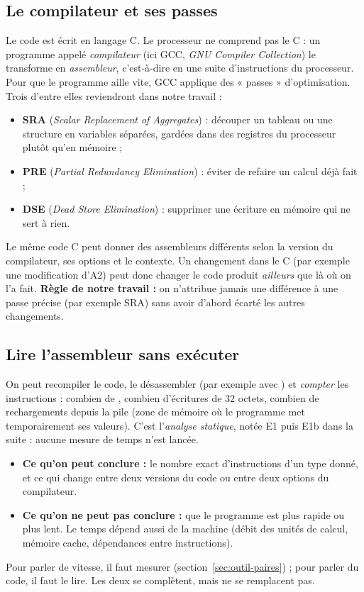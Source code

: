 \subsection{Le compilateur et ses passes}\label{sec:outil-compilo}
Le code est écrit en langage C. Le processeur ne comprend pas le C : un programme appelé \emph{compilateur} (ici GCC, \emph{GNU Compiler Collection}) le transforme en \emph{assembleur}, c'est-à-dire en une suite d'instructions du processeur. Pour que le programme aille vite, GCC applique des « passes » d'optimisation. Trois d'entre elles reviendront dans notre travail :
\begin{itemize}[itemsep=1pt]
\item \textbf{SRA} (\emph{Scalar Replacement of Aggregates}) : découper un tableau ou une structure en variables séparées, gardées dans des registres du processeur plutôt qu'en mémoire ;
\item \textbf{PRE} (\emph{Partial Redundancy Elimination}) : éviter de refaire un calcul déjà fait ;
\item \textbf{DSE} (\emph{Dead Store Elimination}) : supprimer une écriture en mémoire qui ne sert à rien.
\end{itemize}
Le même code C peut donner des assembleurs différents selon la version du compilateur, ses options et le contexte. Un changement dans le C (par exemple une modification d'A2) peut donc changer le code produit \emph{ailleurs} que là où on l'a fait. \textbf{Règle de notre travail :} on n'attribue jamais une différence à une passe précise (par exemple SRA) sans avoir d'abord écarté les autres changements.

\subsection{Lire l'assembleur sans exécuter}\label{sec:outil-asm}
On peut recompiler le code, le désassembler (par exemple avec ) et \emph{compter} les instructions : combien de \vpshufb{}, combien d'écritures de 32 octets, combien de rechargements depuis la pile (zone de mémoire où le programme met temporairement ses valeurs). C'est l'\emph{analyse statique}, notée E1 puis E1b dans la suite : aucune mesure de temps n'est lancée.
\begin{itemize}[itemsep=1pt]
\item \textbf{Ce qu'on peut conclure :} le nombre exact d'instructions d'un type donné, et ce qui change entre deux versions du code ou entre deux options du compilateur.
\item \textbf{Ce qu'on ne peut pas conclure :} que le programme est plus rapide ou plus lent. Le temps dépend aussi de la machine (débit des unités de calcul, mémoire cache, dépendances entre instructions).
\end{itemize}
Pour parler de vitesse, il faut mesurer (section~\ref{sec:outil-paires}) ; pour parler du code, il faut le lire. Les deux se complètent, mais ne se remplacent pas.

